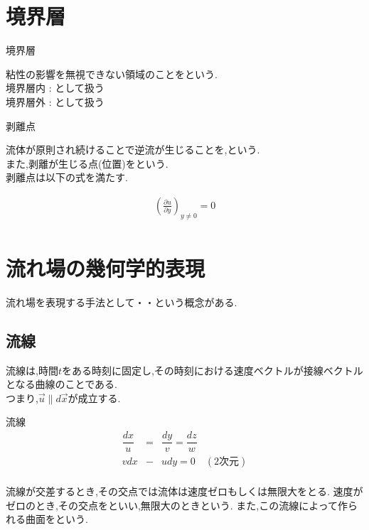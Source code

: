 \documentclass[a4paper]{jsarticle}
\begin{document}
\section{境界層}
\begin{itembox}[l]{境界層}
    \begin{center}
        粘性の影響を無視できない領域のことをという.\\
        境界層内 : として扱う  \\
        境界層外 : として扱う
    \end{center}
\end{itembox}
\begin{itembox}[l]{剥離点}
    \begin{center}
        流体が原則され続けることで逆流が生じることを,という.\\
        また,剥離が生じる点(位置)をという.\\
        剥離点は以下の式を満たす.
    \end{center}
    \begin{eqnarray*}
        \left(\frac{\partial u}{\partial y}\right)_{y\neq 0}=0\\
    \end{eqnarray*}
\end{itembox}
\section{流れ場の幾何学的表現}
流れ場を表現する手法として・・という概念がある.\\
\subsection{流線}
流線は,時間$t$をある時刻に固定し,その時刻における速度ベクトルが接線ベクトルとなる曲線のことである.\\
つまり,$\vec{u}\parallel d\vec{x}$が成立する.
\begin{itembox}[l]{流線}
    \begin{eqnarray*}
        \dfrac{dx}{u}&=&\dfrac{dy}{v}=\dfrac{dz}{w}\\
        vdx&-&udy=0\quad (2次元)\\
    \end{eqnarray*}
\end{itembox}
流線が交差するとき,その交点では流体は速度ゼロもしくは無限大をとる.
速度がゼロのとき,その交点をといい,無限大のときという.
また,この流線によって作られる曲面をという.
\end{document}
